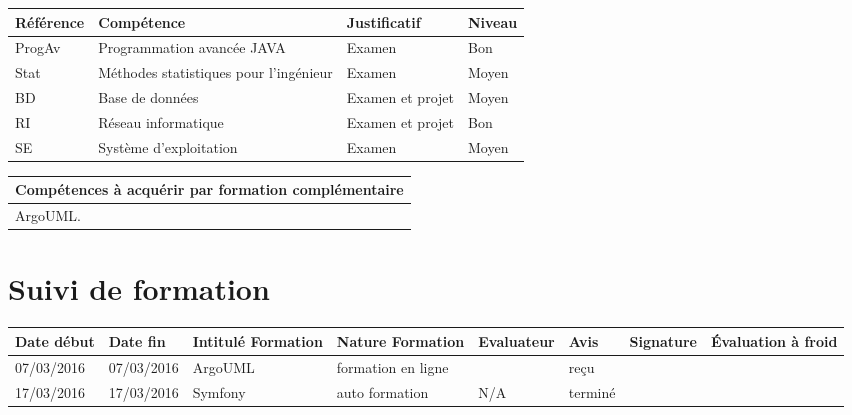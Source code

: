 \documentclass[11pt]{article}
\begin{document}
\begin{table}[!hp]
\centering
	\begin{tabularx}{\linewidth}{|X|X|X|X|}
	\hline
	\rowcolor{gray!40} Référence & Compétence & Justificatif & Niveau \\
	\hline
	 ProgAv & Programmation avancée JAVA & Examen & Bon \\
	\hline
	 Stat & Méthodes statistiques pour l'ingénieur & Examen & Moyen \\
	 \hline
	 BD & Base de données & Examen et projet & Moyen \\
	 \hline
	 RI & Réseau informatique & Examen et projet & Bon \\
	 \hline
	 SE & Système d'exploitation & Examen & Moyen \\
	 \hline
	\end{tabularx}
\end{table}

\begin{table}[!hp]
\centering
	\begin{tabularx}{\linewidth}{|X|}
	\hline
	\rowcolor{gray!40} Compétences à acquérir par formation complémentaire \\
	\hline
	ArgoUML.  \\
	\hline
	\end{tabularx}
\end{table}

\section*{\large Suivi de formation}

\centering
	\begin{longtable}{|p{}|p{}|p{}|p{}|p{}|p{}|p{}|p{}|}
	\hline
	\rowcolor{gray!40} \tiny Date début & \tiny Date fin & \tiny Intitulé Formation & \tiny Nature Formation & \tiny Evaluateur & \tiny Avis & \tiny Signature & \tiny Évaluation à froid \\
	\hline
	07/03/2016 &07/03/2016 & ArgoUML &formation en ligne &\Julie &reçu & & \\
	\hline
	17/03/2016 & 17/03/2016 & Symfony &auto formation & N/A & terminé & &  \\
	\hline
	\end{longtable}
\end{document}
